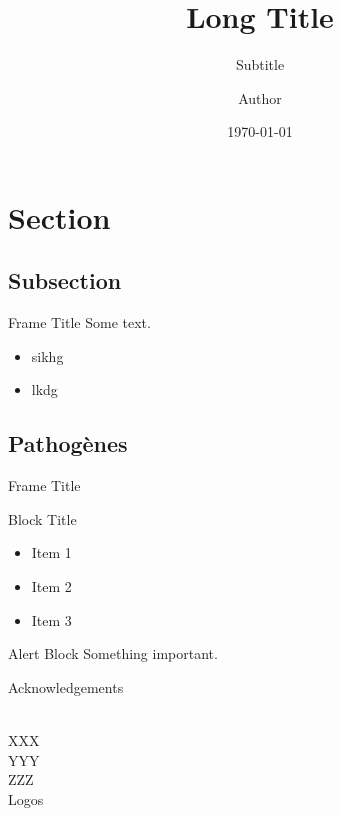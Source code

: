 \documentclass{myBeamerMinimal}
\title{Long Title}
\subtitle{Subtitle}
\author{Author}
\date{\today}
\institute{Institut\\
\bigskip
}
\begin{document}
\begin{frame}[plain]
	\titlepage
\end{frame}
\addtocounter{framenumber}{-1}

\AtBeginSection[]
{
	\frame{
		\sectionpage
	}
	\addtocounter{framenumber}{-1}
}


\section{Section}
\subsection{Subsection}

\begin{frame}{Frame Title}
	Some text.
	\begin{itemize}
		\item sikhg
		\item lkdg
	\end{itemize}
\end{frame}


\subsection{Pathogènes}

\begin{frame}{Frame Title}
	\begin{block}{Block Title}
	\begin{itemize}
		\item Item 1
		\item Item 2
		\item Item 3
	\end{itemize}
	\end{block}
	
	\begin{alertblock}{Alert Block}
		Something important.
	\end{alertblock}
\end{frame}


\backupbegin

\appendix
\begin{frame}[plain]{Acknowledgements}
	\begin{center}
	\\
	
	\medskip
	XXX\\
	\medskip
	YYY\\
	\medskip
	ZZZ\\
	
	\bigskip
	Logos
	\end{center}
	
\end{frame}

%

\backupend
\end{document}

